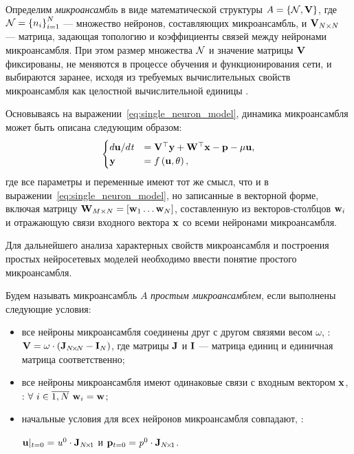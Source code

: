 
\begin{Definition*}
    Определим \textit{микроансамбль} в виде математической структуры $A = \left\{ \mathcal{N}, \mathrm{\mathbf{V}} \right\}$, где $\mathcal{N} = \left\{ n_{i} \right\}_{i=1}^{N} $ --- множество нейронов, составляющих микроансамбль, и $\mathrm{\mathbf{V}}_{N \times N}$ --- матрица, задающая топологию и коэффициенты связей между нейронами микроансамбля. При этом размер множества $\mathcal{N}$ и значение матрицы $\mathrm{\mathbf{V}}$ фиксированы, \ie не меняются в процессе обучения и функционирования сети, и выбираются заранее, исходя из требуемых вычислительных свойств микроансамбля как целостной вычислительной единицы .
\end{Definition*}

Основываясь на выражении~\eqref{eq:single_neuron_model}, динамика микроансамбля может быть описана следующим образом:
\begin{equation}
    \label{eq:microensemble_model}
    \begin{cases}
        d\mathrm{\mathbf{u}}/d\mathit{t} &= \mathrm{\mathbf{V}}^{\top} \mathrm{\mathbf{y}} + \mathrm{\mathbf{W}}^{\top} \mathrm{\mathbf{x}} - \mathrm{\mathbf{p}} - \mu \mathrm{\mathbf{u}}, \\
        \mathrm{\mathbf{y}}              &= f\left( \mathrm{\mathbf{u}}, \theta \right), \\
    \end{cases}
\end{equation}
где все параметры и переменные имеют тот же смысл, что и в выражении~\eqref{eq:single_neuron_model}, но записанные в векторной форме, включая матрицу $\mathrm{\mathbf{W}}_{M \times N} = \left[ \mathrm{\mathbf{w}}_{1} \ldots \mathrm{\mathbf{w}}_{N} \right]$, составленную из векторов-столбцов $\mathrm{\mathbf{w}}_{i}$ и отражающую связи входного вектора $\mathrm{\mathbf{x}}$ со всеми нейронами микроансамбля.

Для дальнейшего анализа характерных свойств микроансамбля и построения простых нейросетевых моделей необходимо ввести понятие простого микроансамбля.
\begin{Definition*}
    Будем называть микроансамбль $A$ \textit{простым микроансамблем}, если выполнены следующие условия:
    \begin{itemize}
        \item все нейроны микроансамбля соединены друг с другом связями весом $\omega$, \ie: $\mathrm{\mathbf{V}} = \omega \cdot \left( \mathrm{\mathbf{J}}_{N\!\times\!N} - \mathrm{\mathbf{I}}_{N} \right)$, где матрицы $\mathrm{\mathbf{J}}$ и $\mathrm{\mathbf{I}}$  --- матрица единиц и единичная матрица соответственно;
        \item все нейроны микроансамбля имеют одинаковые связи с входным вектором $\mathrm{\mathbf{x}}$, \ie: $\forall\ i \in \overline{1,N}\ \mathrm{\mathbf{w}}_{i} = \mathrm{\mathbf{w}}$;
        \item начальные условия для всех нейронов микроансамбля совпадают, \ie: \par $\mathrm{\mathbf{u}}|_{t=0} = \mathit{u}^{0} \cdot \mathrm{\mathbf{J}}_{N\!\times\!1}$ и $\mathrm{\mathbf{p}}_{t=0} = \mathit{p}^{0} \cdot \mathrm{\mathbf{J}}_{N\!\times\!1}$.
    \end{itemize}
\end{Definition*}

